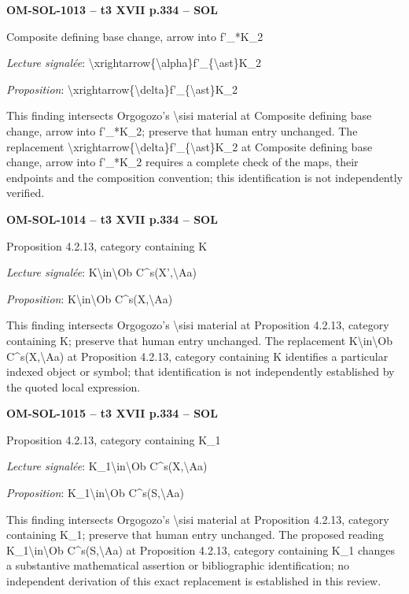 \par\noindent\textbf{OM-SOL-1013 -- t3 XVII p.334 -- SOL}\par
Composite defining base change, arrow into f'\_*K\_2\par
\emph{Lecture signalée}: \textbackslash{}xrightarrow\{\textbackslash{}alpha\}f'\_\{\textbackslash{}ast\}K\_2\par
\emph{Proposition}: \textbackslash{}xrightarrow\{\textbackslash{}delta\}f'\_\{\textbackslash{}ast\}K\_2\par
This finding intersects Orgogozo's \textbackslash{}sisi material at Composite defining base change, arrow into f'\_*K\_2; preserve that human entry unchanged. The replacement \textbackslash{}xrightarrow\{\textbackslash{}delta\}f'\_\{\textbackslash{}ast\}K\_2 at Composite defining base change, arrow into f'\_*K\_2 requires a complete check of the maps, their endpoints and the composition convention; this identification is not independently verified.\par
\par\noindent\textbf{OM-SOL-1014 -- t3 XVII p.334 -- SOL}\par
Proposition 4.2.13, category containing K\par
\emph{Lecture signalée}: K\textbackslash{}in\textbackslash{}Ob C\textasciicircum{}s(X',\textbackslash{}Aa)\par
\emph{Proposition}: K\textbackslash{}in\textbackslash{}Ob C\textasciicircum{}s(X,\textbackslash{}Aa)\par
This finding intersects Orgogozo's \textbackslash{}sisi material at Proposition 4.2.13, category containing K; preserve that human entry unchanged. The replacement K\textbackslash{}in\textbackslash{}Ob C\textasciicircum{}s(X,\textbackslash{}Aa) at Proposition 4.2.13, category containing K identifies a particular indexed object or symbol; that identification is not independently established by the quoted local expression.\par
\par\noindent\textbf{OM-SOL-1015 -- t3 XVII p.334 -- SOL}\par
Proposition 4.2.13, category containing K\_1\par
\emph{Lecture signalée}: K\_1\textbackslash{}in\textbackslash{}Ob C\textasciicircum{}s(X,\textbackslash{}Aa)\par
\emph{Proposition}: K\_1\textbackslash{}in\textbackslash{}Ob C\textasciicircum{}s(S,\textbackslash{}Aa)\par
This finding intersects Orgogozo's \textbackslash{}sisi material at Proposition 4.2.13, category containing K\_1; preserve that human entry unchanged. The proposed reading K\_1\textbackslash{}in\textbackslash{}Ob C\textasciicircum{}s(S,\textbackslash{}Aa) at Proposition 4.2.13, category containing K\_1 changes a substantive mathematical assertion or bibliographic identification; no independent derivation of this exact replacement is established in this review.\par
